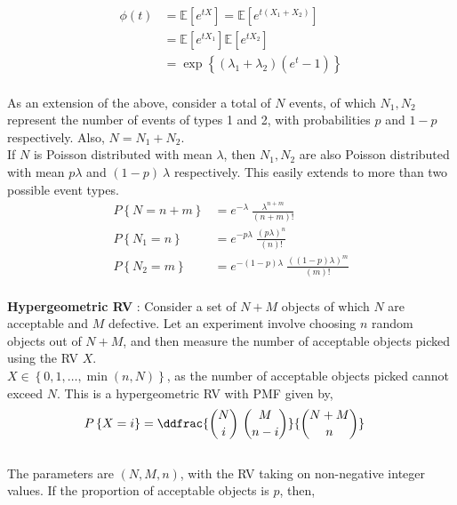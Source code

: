 \begin{align}
	\phi (t) &= \mathbb{E}[e^{tX}] = \mathbb{E}[e^{t(X_1 + X_2)}] \nonumber \\[1ex]
	&= \mathbb{E}[e^{tX_1}] \mathbb{E}[e^{tX_2}] \nonumber \\[1ex]
	&= \exp\left\{(\lambda_1 + \lambda_2) (e^t - 1)\right\}
\end{align} \\

As an extension of the above, consider a total of $ N $ events, of which $ N_1, N_2 $ represent the number of events of types 1 and 2, with probabilities $ p $ and $ 1-p $ respectively. Also, $ N = N_1 + N_2 $. \\

If $ N $ is Poisson distributed with mean $\lambda$, then $ N_1, N_2 $ are also Poisson distributed with mean $ p\lambda $ and $ (1-p)\ \lambda $ respectively. This easily extends to more than two possible event types.\\

\begin{align}
	P\left\{N = n+m\right\} &= e^{-\lambda} \ \frac{\lambda^{n+m}}{(n+m)!} \nonumber \\[1ex]
	P\left\{N_1 = n\right\} &= e^{-p\lambda} \ \frac{(p\lambda)^{n}}{(n)!} \nonumber \\[1ex]
	P\left\{N_2 = m\right\} &= e^{-(1-p)\lambda} \ \frac{((1-p)\lambda)^{m}}{(m)!}
\end{align}\\

\textbf{Hypergeometric RV} : Consider a set of $ N+M $ objects of which $ N $ are acceptable and $ M $ defective. Let an experiment involve choosing $ n $ random objects out of $ N+M $, and then measure the number of acceptable objects picked using the RV $ X $. \\

$ X \in \left\{0, 1, \dots, \min(n, N) \right\} $, as the number of acceptable objects picked cannot exceed $ N $. This is a hypergeometric RV with PMF given by, \\

\begin{align}
	P \left\{X = i\right\} &= \ddfrac{\binom{N}{i}\ \binom{M}{n-i}}{\binom{N+M}{n}}
\end{align}\\

The parameters are $ (N, M, n) $, with the RV taking on non-negative integer values. If the proportion of acceptable objects is $ p $, then, \\

